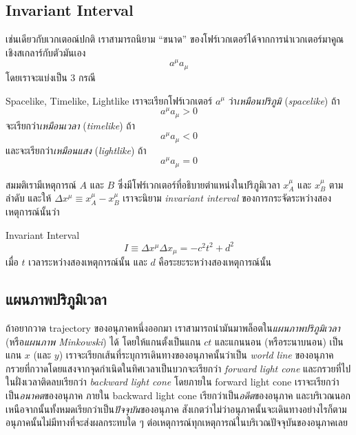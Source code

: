 \subsection{Invariant Interval}

เช่นเดียวกับเวกเตอณ์ปกติ เราสามารถนิยาม ``ขนาด'' ของโฟร์เวกเตอร์ได้จากการนำเวกเตอร์มาคูณเชิงสเกลาร์กับตัวมันเอง
\[
a^\mu a_\mu
\]
โดยเราจะแบ่งเป็น $3$ กรณี
\begin{defbox}{ Spacelike, Timelike, Lightlike}
    เราจะเรียกโฟร์เวกเตอร์ $a^\mu$ ว่า\emph{เหมือนปริภูมิ} (\emph{spacelike}) ถ้า
    \[
    a^\mu a_\mu > 0
    \]
    จะเรียกว่า\emph{เหมือนเวลา} (\emph{timelike}) ถ้า
    \[
    a^\mu a_\mu < 0
    \]
    และจะเรียกว่า\emph{เหมือนแสง} (\emph{lightlike}) ถ้า
    \[
    a^\mu a_\mu = 0
    \]
\end{defbox}

สมมติเรามีเหตุการณ์ $A$ และ $B$ ซึ่งมีโฟร์เวกเตอร์ที่อธิบายตำแหน่งในปริภูมิเวลา $x_A^\mu$ และ $x_B^\mu$ ตามลำดับ และให้ $\Delta x^\mu \equiv x_A^\mu - x_B^\mu$ เราจะนิยาม \emph{invariant interval} ของการกระจัดระหว่างสองเหตุการณ์นั้นว่า
\begin{defbox}{ Invariant Interval}
    \begin{equation}
        I \equiv \Delta x^\mu\Delta x_\mu = -c^2t^2 + d^2
    \end{equation}
    เมื่อ $t$ เวลาระหว่างสองเหตุการณ์นั้น และ $d$ คือระยะระหว่างสองเหตุการณ์นั้น
\end{defbox}

\subsection{แผนภาพปริภูมิเวลา}

ถ้าอยากวาด trajectory ของอนุภาคหนึ่งออกมา เราสามารถนำมันมาพล็อตใน\emph{แผนภาพปริภูมิเวลา} (หรือ\emph{แผนภาพ Minkowski}) ได้ โดยให้แกนตั้งเป็นแกน $ct$ และแกนนอน (หรือระนาบนอน) เป็นแกน $x$ (และ $y$) เราจะเรียกเส้นที่ระบุการเดินทางของอนุภาคนั้นว่าเป็น \emph{world line} ของอนุภาค กรวยที่กวาดโดยแสงจากจุดกำเนิดในทิศเวลาเป็นบวกจะเรียกว่า \emph{forward light cone} และกรวยที่ไปในฝั่งเวลาติดลบเรียกว่า \emph{backward light cone} โดยภายใน forward light cone เราจะเรียกว่าเป็น\emph{อนาคต}ของอนุภาค ภายใน backward light cone เรียกว่าเป็น\emph{อดีต}ของอนุภาค และบริเวณนอกเหนือจากนั้นทั้งหมดเรียกว่าเป็น\emph{ปัจจุบัน}ของอนุภาค สังเกตว่าไม่ว่าอนุภาคนั้นจะเดินทางอย่างไรก็ตาม อนุภาคนั้นไม่มีทางที่จะส่งผลกระทบใด ๆ ต่อเหตุการณ์ทุกเหตุการณ์ในบริเวณปัจจุบันของอนุภาคเลย

